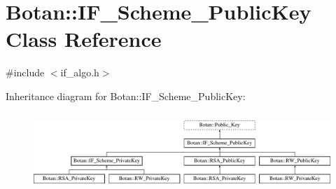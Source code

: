\hypertarget{classBotan_1_1IF__Scheme__PublicKey}{\section{Botan\-:\-:I\-F\-\_\-\-Scheme\-\_\-\-Public\-Key Class Reference}
\label{classBotan_1_1IF__Scheme__PublicKey}
}


{\ttfamily \#include $<$if\-\_\-algo.\-h$>$}

Inheritance diagram for Botan\-:\-:I\-F\-\_\-\-Scheme\-\_\-\-Public\-Key\-:\begin{figure}[H]
\begin{center}
\leavevmode
\includegraphics[height=2.947368cm]{classBotan_1_1IF__Scheme__PublicKey}
\end{center}
\end{figure}
